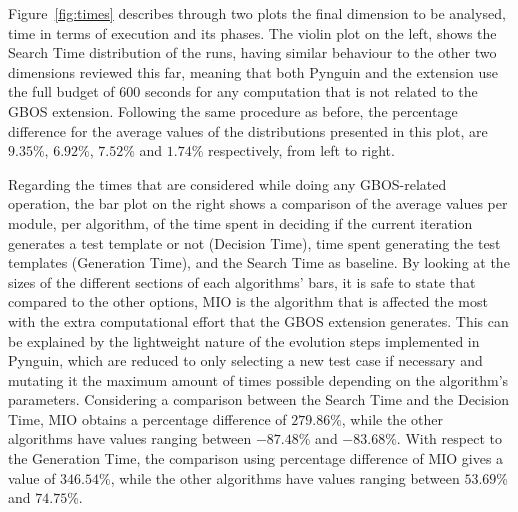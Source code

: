 \documentclass[%
  chapterprefix=false,%
  open=right,%
  twoside=true,%
  paper=a4,%
  logofile={Figures/logo.png},%
  thesistype=master,%
  UKenglish,%
]{se2thesis}
\begin{document}
Figure~\ref{fig:times} describes through two plots the final dimension to be analysed, time in terms of execution and its phases.
The violin plot on the left, shows the Search Time distribution of the runs, having similar behaviour to the other two dimensions reviewed this far, meaning that both Pynguin and the extension use the full budget of 600 seconds for any computation that is not related to the GBOS extension.
Following the same procedure as before, the percentage difference for the average values of the distributions presented in this plot, are \(9.35\%\), \(6.92\%\), \(7.52\%\) and \(1.74\%\) respectively, from left to right.

Regarding the times that are considered while doing any GBOS-related operation, the bar plot on the right shows a comparison of the average values per module, per algorithm, of the time spent in deciding if the current iteration generates a test template or not (Decision Time), time spent generating the test templates (Generation Time), and the Search Time as baseline.
By looking at the sizes of the different sections of each algorithms' bars, it is safe to state that compared to the other options, MIO is the algorithm that is affected the most with the extra computational effort that the GBOS extension generates.
This can be explained by the lightweight nature of the evolution steps implemented in Pynguin, which are reduced to only selecting a new test case if necessary and mutating it the maximum amount of times possible depending on the algorithm's parameters.
Considering a comparison between the Search Time and the Decision Time, MIO obtains a percentage difference of \(279.86\%\), while the other algorithms have values ranging between \(-87.48\%\) and \(-83.68\%\).
With respect to the Generation Time, the comparison using percentage difference of MIO gives a value of \(346.54\%\), while the other algorithms have values ranging between \(53.69\%\) and \(74.75\%\).
\end{document}
